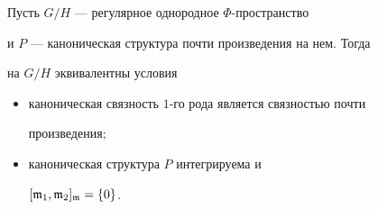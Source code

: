  


\begin{thm} Пусть $G/H$ --- регулярное однородное $\Phi$-пространство 


и $P$ --- каноническая структура почти произведения на нем. Тогда 


на $G/H$ эквивалентны условия 


\begin{itemize} 


\item[1)] каноническая связность $1$-го рода является связностью почти 


произведения$;$ 


\item[2)] каноническая структура $P$ интегрируема и 


$[\frak m_1,\frak m_2]_{\frak m}=\{0\}$. 


\end{itemize} 


\end{thm} 


 


